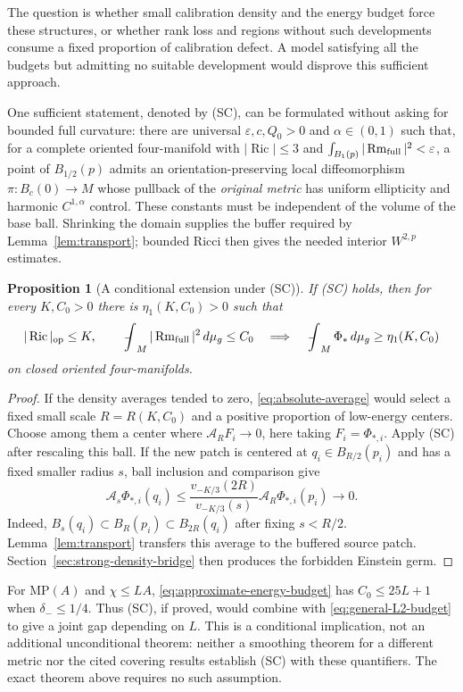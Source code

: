 \documentclass[a4paper,11pt]{article}
\numberwithin{equation}{section}
\newtheorem{proposition}[theorem]{Proposition}
\theoremstyle{definition}
\newcommand{\Ric}{\operatorname{Ric}}
\newcommand{\Rm}{\operatorname{Rm}}
\newcommand{\op}{\mathrm{op}}
\newcommand{\dd}{\,d\mu_g}
\newcommand{\fint}{\mathop{\rlap{\,\raisebox{0.1ex}{\tiny$-$}}\int}\nolimits}
\begin{document}
The question is whether small calibration density and the energy budget force these structures, or whether rank loss and regions without such developments consume a fixed proportion of calibration defect. A model satisfying all the budgets but admitting no suitable development would disprove this sufficient approach.

One sufficient statement, denoted by (SC), can be formulated without asking for bounded full curvature: there are universal $\varepsilon,c,Q_0>0$ and $\alpha\in(0,1)$ such that, for a complete oriented four-manifold with $|\Ric|\le3$ and $\int_{B_1(p)}|\Rm_{\rm full}|^2<\varepsilon$, a point of $B_{1/2}(p)$ admits an orientation-preserving local diffeomorphism $\pi:B_c(0)\to M$ whose pullback of the \emph{original metric} has uniform ellipticity and harmonic $C^{1,\alpha}$ control. These constants must be independent of the volume of the base ball. Shrinking the domain supplies the buffer required by Lemma~\ref{lem:transport}; bounded Ricci then gives the needed interior $W^{2,p}$ estimates.

\begin{proposition}[A conditional extension under (SC)]\label{prop:SC-density}
If (SC) holds, then for every $K,C_0>0$ there is $\eta_1(K,C_0)>0$ such that
\[
|\Ric|_{\op}\le K,\qquad \fint_M|\Rm_{\rm full}|^2\dd\le C_0
\quad\Longrightarrow\quad \fint_M\Phi_*\dd\ge\eta_1(K,C_0)
\]
on closed oriented four-manifolds.
\end{proposition}
\begin{proof}
If the density averages tended to zero, \eqref{eq:absolute-average} would select a fixed small scale $R=R(K,C_0)$ and a positive proportion of low-energy centers. Choose among them a center where $\mathcal A_RF_i\to0$, here taking $F_i=\Phi_{*,i}$. Apply (SC) after rescaling this ball. If the new patch is centered at $q_i\in B_{R/2}(p_i)$ and has a fixed smaller radius $s$, ball inclusion and comparison give
\[
\mathcal A_s\Phi_{*,i}(q_i)
\le\frac{v_{-K/3}(2R)}{v_{-K/3}(s)}\mathcal A_R\Phi_{*,i}(p_i)
\longrightarrow0.
\]
Indeed, $B_s(q_i)\subset B_R(p_i)\subset B_{2R}(q_i)$ after fixing $s<R/2$. Lemma~\ref{lem:transport} transfers this average to the buffered source patch. Section~\ref{sec:strong-density-bridge} then produces the forbidden Einstein germ.
\end{proof}
For $\mathrm{MP}(A)$ and $\chi\le LA$, \eqref{eq:approximate-energy-budget} has $C_0\le25L+1$ when $\delta_-\le1/4$. Thus (SC), if proved, would combine with \eqref{eq:general-L2-budget} to give a joint gap depending on $L$. This is a conditional implication, not an additional unconditional theorem: neither a smoothing theorem for a different metric nor the cited covering results establish (SC) with these quantifiers. The exact theorem above requires no such assumption.
\end{document}

